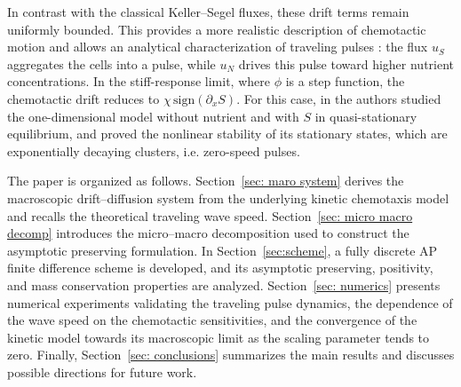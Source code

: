 \documentclass[11pt,twoside]{article}
\numberwithin{equation}{section}
\theoremstyle{plain}
\theoremstyle{nonumberplain}
\begin{document}
In contrast with the classical Keller–Segel fluxes, these drift terms remain uniformly bounded. This provides a more realistic description of chemotactic motion and allows an analytical characterization of traveling pulses \cite{calvez2019chemotactic}: the flux $u_S$ aggregates the cells into a pulse, while $u_N$ drives this pulse toward higher nutrient concentrations. In the stiff-response limit, where $\phi$ is a step function, the chemotactic drift reduces to $\chi\,\mathrm{sign}(\partial_x S)$. For this case, in \cite{calvez2023nonlinear} the authors studied the one-dimensional model without nutrient and with $S$ in quasi-stationary equilibrium, and proved the nonlinear stability of its stationary states, which are exponentially decaying clusters, i.e. zero-speed pulses.












The paper is organized as follows. Section~\ref{sec: maro system} derives the macroscopic drift–diffusion system from the underlying kinetic chemotaxis model and recalls the theoretical traveling wave speed. Section~\ref{sec: micro macro decomp} introduces the micro–macro decomposition used to construct the asymptotic preserving formulation. In Section~\ref{sec:scheme}, a fully discrete AP finite difference scheme is developed, and its asymptotic preserving, positivity, and mass conservation properties are analyzed. Section~\ref{sec: numerics} presents numerical experiments validating the traveling pulse dynamics, the dependence of the wave speed on the chemotactic sensitivities, and the convergence of the kinetic model towards its macroscopic limit as the scaling parameter tends to zero. Finally, Section~\ref{sec: conclusions} summarizes the main results and discusses possible directions for future work.
\end{document}
